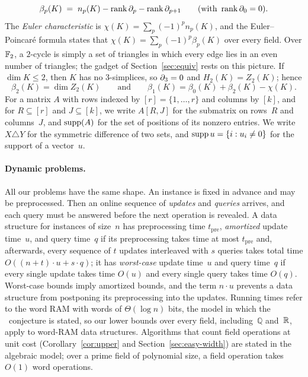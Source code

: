 \begin{equation}\label{eq:betti-rank}
  \beta_p(K)\;=\;n_p(K)-\operatorname{rank}\partial_p-\operatorname{rank}\partial_{p+1}\qquad(\text{with } \operatorname{rank}\partial_0=0).
\end{equation}
The \emph{Euler characteristic} is $\chi(K)=\sum_p(-1)^p n_p(K)$, and the Euler--Poincar\'e formula states that $\chi(K)=\sum_p(-1)^p\beta_p(K)$ over every field.
Over $\mathbb{F}_2$, a $2$-cycle is simply a set of triangles in which every edge lies in an even number of triangles; the gadget of Section~\ref{sec:equiv} rests on this picture.
If $\dim K\le 2$, then $K$ has no $3$-simplices, so $\partial_3=0$ and $H_2(K)=Z_2(K)$; hence
\begin{equation}\label{eq:euler}
  \beta_2(K)=\dim Z_2(K)\qquad\text{and}\qquad \beta_1(K)=\beta_0(K)+\beta_2(K)-\chi(K).
\end{equation}
For a matrix $A$ with rows indexed by $[r]=\{1,\dots,r\}$ and columns by $[k]$, and for $R\subseteq[r]$ and $J\subseteq[k]$, we write $A[R,J]$ for the submatrix on rows~$R$ and columns~$J$, and $\operatorname{supp}(A)$ for the set of positions of its nonzero entries. We write $X\triangle Y$ for the symmetric difference of two sets, and $\operatorname{supp} u=\{i:u_i\ne0\}$ for the support of a vector~$u$.

\paragraph{Dynamic problems.}
All our problems have the same shape.
An instance is fixed in advance and may be preprocessed.
Then an online sequence of \emph{updates} and \emph{queries} arrives, and each query must be answered before the next operation is revealed.
A data structure for instances of size~$n$ has preprocessing time $t_{\mathrm{pre}}$, \emph{amortized} update time~$u$, and query time~$q$ if its preprocessing takes time at most $t_{\mathrm{pre}}$ and, afterwards, every sequence of $t$ updates interleaved with $s$ queries takes total time $O((n+t)\cdot u+s\cdot q)$; it has \emph{worst-case} update time~$u$ and query time~$q$ if every single update takes time $O(u)$ and every single query takes time $O(q)$.
Worst-case bounds imply amortized bounds, and the term $n\cdot u$ prevents a data structure from postponing its preprocessing into the updates.
Running times refer to the word RAM with words of $\Theta(\log n)$ bits, the model in which the \OMv\ conjecture is stated, so our lower bounds over every field, including~$\mathbb{Q}$ and~$\mathbb{R}$, apply to word-RAM data structures.
Algorithms that count field operations at unit cost (Corollary~\ref{cor:upper} and Section~\ref{sec:easy-width}) are stated in the algebraic model; over a prime field of polynomial size, a field operation takes $O(1)$ word operations.

